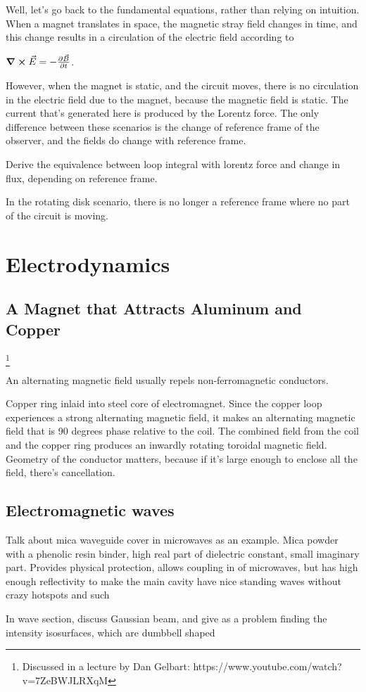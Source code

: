 \documentclass[12pt]{book}
\begin{document}
Well, let's go back to the fundamental equations, rather than relying on intuition.
When a magnet translates in space, the magnetic stray field changes in time, and this change results in a circulation of the electric field according to

$\curl{\vec{E}} = - \pdv{\vec{B}}{t}$.

However, when the magnet is static, and the circuit moves, there is no circulation in the electric field due to the magnet, because the magnetic field is static.
The current that's generated here is produced by the Lorentz force.
The only difference between these scenarios is the change of reference frame of the observer, and the fields do change with reference frame.

	{\color{red} Derive the equivalence between loop integral with lorentz force and change in flux, depending on reference frame.}

In the rotating disk scenario, there is no longer a reference frame where no part of the circuit is moving.

\part{Electrodynamics}

\chapter{A Magnet that Attracts Aluminum and Copper}

\footnote{Discussed in a lecture by Dan Gelbart: https://www.youtube.com/watch?v=7ZeBWJLRXqM}

An alternating magnetic field usually repels non-ferromagnetic conductors.

Copper ring inlaid into steel core of electromagnet.
Since the copper loop experiences a strong alternating magnetic field, it makes an alternating magnetic field that is 90 degrees phase relative to the coil.
The combined field from the coil and the copper ring produces an inwardly rotating toroidal magnetic field.
Geometry of the conductor matters, because if it's large enough to enclose all the field, there's cancellation.

\chapter{Electromagnetic waves}
Talk about mica waveguide cover in microwaves as an example. Mica powder with a phenolic resin binder, high real part of dielectric constant, small imaginary part.
Provides physical protection, allows coupling in of microwaves, but has high enough reflectivity to make the main cavity have nice standing waves without crazy hotspots and such


In wave section, discuss Gaussian beam, and give as a problem finding the intensity isosurfaces, which are dumbbell shaped

\blinddocument
\end{document}
